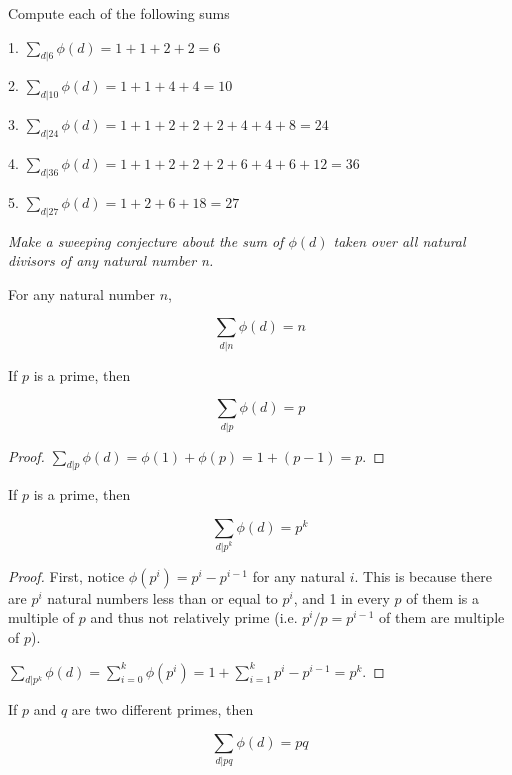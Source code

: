 \documentclass[../main.tex]{subfiles}
\begin{document}
\begin{ex} \label{6.10}
  Compute each of the following sums
\end{ex}

1. $\sum_{d | 6} \phi(d) = 1 + 1 + 2 + 2 = 6$

2. $\sum_{d|10} \phi(d) = 1 + 1 + 4 + 4 = 10$

3. $\sum_{d|24} \phi(d) = 1 + 1 + 2 + 2 + 2 + 4 + 4 + 8 = 24$

4. $\sum_{d|36} \phi(d) = 1 + 1 + 2 + 2 + 2 + 6 + 4 + 6 + 12 = 36$

5. $\sum_{d|27} \phi(d) = 1 + 2 + 6 + 18 = 27$

\emph{Make a sweeping conjecture about the sum of $\phi(d)$ taken over all natural divisors of any natural number n.}

\begin{PC} \label{PC 6.18}
  For any natural number $n$,

  $$\sum_{d | n} \phi(d) = n$$
\end{PC}



\begin{thm} \label{6.11}
  If $p$ is a prime, then

  $$\sum_{d|p} \phi(d) = p$$
\end{thm}

\begin{proof}
  $\sum_{d|p} \phi(d) = \phi(1) + \phi(p) = 1 + (p-1) = p$.
\end{proof}



\begin{thm} \label{6.12}
  If $p$ is a prime, then

  $$\sum_{d|p^k} \phi(d) = p^k$$
\end{thm}

\begin{proof}
  First, notice $\phi(p^i) = p^i - p^{i-1}$ for any natural $i$. This is because there are $p^i$ natural numbers less than or equal to $p^i$, and 1 in every $p$ of them is a multiple of $p$ and thus not relatively prime (i.e. $p^{i} / p = p^{i-1}$ of them are multiple of $p$).

  $\sum_{d|p^k} \phi(d) = \sum_{i=0}^k \phi(p^i) = 1 + \sum_{i=1}^k p^i - p^{i-1} = p^k$.
\end{proof}



\begin{thm} \label{6.13}
  If $p$ and $q$ are two different primes, then

  $$\sum_{d|pq} \phi(d) = pq$$
\end{thm}
\end{document}
